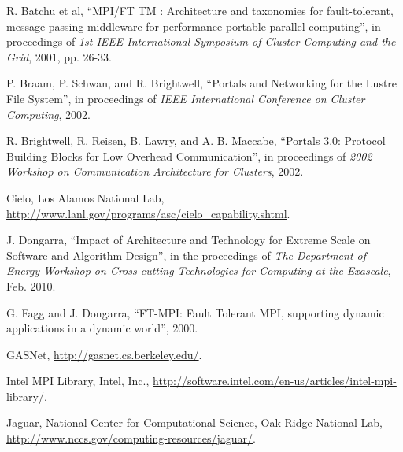 \documentclass[conference]{IEEEtran}
\begin{document}
%
%
%
\begin{thebibliography}{30}

R. Batchu et al, ``MPI/FT TM : Architecture and taxonomies for fault-tolerant,
message-passing middleware for performance-portable parallel computing'', in proceedings
of \emph{1st IEEE International Symposium of Cluster Computing and the Grid}, 2001, pp.
26-33.

P. Braam, P. Schwan, and R. Brightwell, ``Portals and Networking for the Lustre File
System'', in proceedings of \emph{IEEE International Conference on Cluster Computing},
2002.

R. Brightwell, R. Reisen, B. Lawry, and A. B. Maccabe, ``Portals 3.0: Protocol Building
Blocks for Low Overhead Communication'', in proceedings of \emph{2002 Workshop on
Communication Architecture for Clusters}, 2002.

Cielo, Los Alamos National Lab, \url{http://www.lanl.gov/programs/asc/cielo_capability.shtml}.

J. Dongarra, ``Impact of Architecture and Technology for Extreme Scale on Software
and Algorithm Design'', in the proceedings of \emph{The Department of Energy Workshop on
Cross-cutting Technologies for Computing at the Exascale}, Feb. 2010.

G. Fagg and J. Dongarra, ``FT-MPI: Fault Tolerant MPI, supporting dynamic applications in
a dynamic world'', 2000.

GASNet, \url{http://gasnet.cs.berkeley.edu/}.

Intel MPI Library, Intel, Inc.,
\url{http://software.intel.com/en-us/articles/intel-mpi-library/}.

Jaguar, National Center for Computational Science, Oak Ridge National Lab,
\url{http://www.nccs.gov/computing-resources/jaguar/}.


\end{thebibliography}
\end{document}
